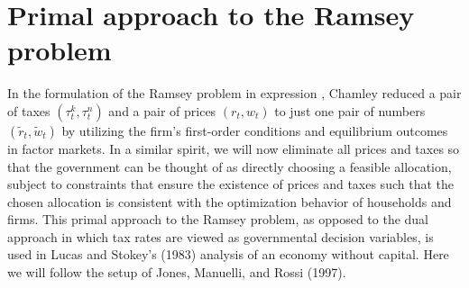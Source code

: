 


\section{Primal approach to the Ramsey problem}
In the formulation of the Ramsey problem in expression , Chamley
reduced  a pair of taxes $(\tau^k_t, \tau^n_t)$ and a pair of
prices $(r_t, w_t)$ to just one pair of numbers
$(\tilde r_t, \tilde w_t)$ by utilizing the firm's first-order
conditions and equilibrium outcomes in factor markets. In a
similar spirit, we will now eliminate all prices and taxes so that
the government can be thought of as directly choosing a feasible
allocation, subject to constraints that ensure the existence
of prices and taxes such that the chosen allocation is
consistent with the optimization behavior of households and firms.
This primal approach to the Ramsey problem, as opposed to the
dual approach in which tax rates are viewed as governmental
decision variables, is used in Lucas and Stokey's (1983)
analysis of an economy without capital. Here we will follow the setup
of Jones, Manuelli, and Rossi (1997).
%

